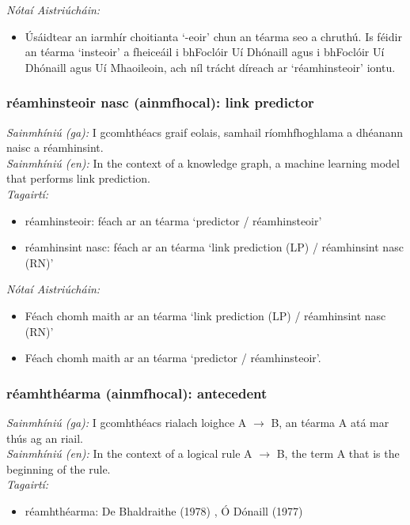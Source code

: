  \noindent \textit{Nótaí Aistriúcháin:}
\begin{itemize}
	\item Úsáidtear an iarmhír choitianta `-eoir' chun an téarma seo a chruthú. Is féidir an téarma `insteoir' a fheiceáil i bhFoclóir Uí Dhónaill agus i bhFoclóir Uí Dhónaill agus Uí Mhaoileoin, ach níl trácht díreach ar `réamhinsteoir' iontu.
\end{itemize}


\subsubsection*{réamhinsteoir nasc (ainmfhocal): link predictor}
 \noindent \textit{Sainmhíniú (ga):} I gcomhthéacs graif eolais, samhail ríomhfhoghlama a dhéanann naisc a réamhinsint.
\\
 \noindent \textit{Sainmhíniú (en):} In the context of a knowledge graph, a machine learning model that performs link prediction.
\\
 \noindent \textit{Tagairtí:}
\begin{itemize}
	\item réamhinsteoir: féach ar an téarma `predictor / réamhinsteoir'
	\item réamhinsint nasc: féach ar an téarma `link prediction (LP) / réamhinsint nasc (RN)'
\end{itemize}

 \noindent \textit{Nótaí Aistriúcháin:}
\begin{itemize}
	\item Féach chomh maith ar an téarma `link prediction (LP) / réamhinsint nasc (RN)'
	\item Féach chomh maith ar an téarma `predictor / réamhinsteoir'.
\end{itemize}


\subsubsection*{réamhthéarma (ainmfhocal): antecedent}
 \noindent \textit{Sainmhíniú (ga):} I gcomhthéacs rialach loighce A $\rightarrow$ B, an téarma A atá mar thús ag an riail.
\\
 \noindent \textit{Sainmhíniú (en):} In the context of a logical rule A $\rightarrow$ B, the term A that is the beginning of the rule.
\\
 \noindent \textit{Tagairtí:}
\begin{itemize}
	\item réamhthéarma: De Bhaldraithe (1978) \cite{de-bhaldraithe}, Ó Dónaill (1977) \cite{odonaill}
\end{itemize}


